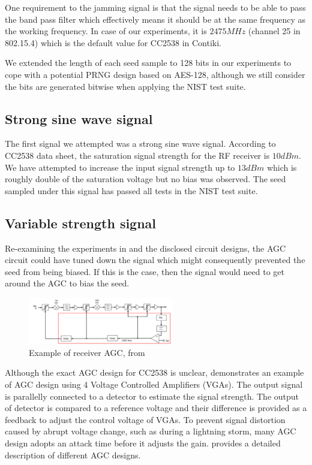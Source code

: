 One requirement to the jamming signal is that the signal needs to be able to pass the band pass filter which effectively means it should be at the same frequency as the working frequency. In case of our experiments, it is $2475MHz$ (channel 25 in 802.15.4) which is the default value for CC2538 in Contiki.

We extended the length of each seed sample to 128 bits in our experiments to cope with a potential PRNG design based on AES-128, although we still consider the bits are generated bitwise when applying the NIST test suite.

\subsection{Strong sine wave signal} \label{StrongSine}
The first signal we attempted was a strong sine wave signal. According to CC2538 data sheet\cite{CC2538Datasheet}, the saturation signal strength for the RF receiver is $10 dBm$. We have attempted to increase the input signal strength up to $13dBm$ which is roughly double of the saturation voltage but no bias was observed. The seed sampled under this signal has passed all tests in the NIST test suite.

\subsection{Variable strength signal} \label{VariableStrength}
Re-examining the experiments in  and the disclosed circuit designs, the AGC circuit could have tuned down the signal which might consequently prevented the seed from being biased. If this is the case, then the signal would need to get around the AGC to bias the seed.

\begin{figure}[!t]
\centering
\includegraphics[width=2.5in]{fig/AGC.png}
\caption{Example of receiver AGC, from \cite{AGC_QSL}}
\label{AGC_QSL}
\end{figure}

Although the exact AGC design for CC2538 is unclear,  demonstrates an example of AGC design using 4 Voltage Controlled Amplifiers (VGAs). The output signal is parallelly connected to a detector to estimate the signal strength. The output of detector is compared to a reference voltage and their difference is provided as a feedback to adjust the control voltage of VGAs. To prevent signal distortion caused by abrupt voltage change, such as during a lightning storm, many AGC design adopts an attack time before it adjusts the gain. \cite{AGC} provides a detailed description of different AGC designs. 
 
